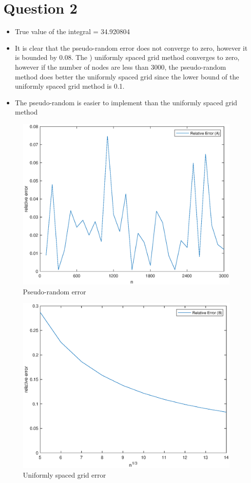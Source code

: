 \documentclass[11pt]{article}
\newcommand{\1}{\mathbbm{1}}
\begin{document}
\section*{Question 2}
\begin{itemize}
\item True value of the integral = 34.920804 
\item It is clear that the  pseudo-random error does not converge to zero, however it is bounded by 0.08. The ) uniformly spaced grid method converges to zero, however if the number of nodes are less than 3000, the   pseudo-random method does better the uniformly spaced grid since the lower bound of the uniformly spaced grid method is 0.1.
\item The  pseudo-random is easier to implement than the uniformly spaced grid method
\end{itemize}


\begin{figure}[h]
	\centering
		\includegraphics[width=\textwidth]{fig2.eps}
	\caption{ Pseudo-random error}
	\label{2a:1}
\end{figure}
\begin{figure}[h]
	\centering
		\includegraphics[width=\textwidth]{fig1.eps}
	\caption{Uniformly spaced grid error}
	\label{2a:1}
\end{figure}
\end{document}

